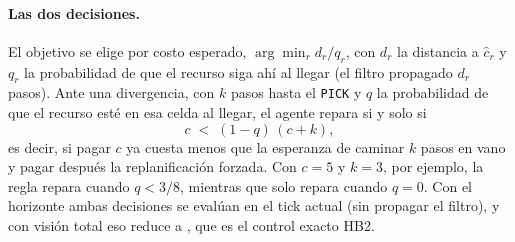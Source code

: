 \paragraph{Las dos decisiones.} El objetivo se elige por costo esperado, $\arg\min_r d_r/q_r$, con $d_r$ la distancia a $\hat{c}_r$ y $q_r$ la probabilidad de que el recurso siga ahí al llegar (el filtro propagado $d_r$ pasos). Ante una divergencia, con $k$ pasos hasta el \texttt{PICK} y $q$ la probabilidad de que el recurso esté en esa celda al llegar, el agente repara si y solo si
\begin{equation}
  c \;<\; (1-q)\,(c+k),
\end{equation}
es decir, si pagar $c$ ya cuesta menos que la esperanza de caminar $k$ pasos en vano y pagar después la replanificación forzada. Con $c=5$ y $k=3$, por ejemplo, la regla repara cuando $q<3/8$, mientras que \KB{} solo repara cuando $q=0$. Con el horizonte \ahora{} ambas decisiones se evalúan en el tick actual (sin propagar el filtro), y con visión total eso reduce \BY{} a \CL, que es el control exacto HB2.
